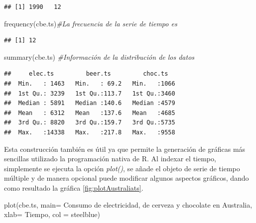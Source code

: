 \documentclass[
  spanish,
]{book}
\newenvironment{Shaded}{\begin{snugshade}}{\end{snugshade}}
\newcommand{\AttributeTok}[1]{\textcolor[rgb]{0.77,0.63,0.00}{#1}}
\newcommand{\CommentTok}[1]{\textcolor[rgb]{0.56,0.35,0.01}{\textit{#1}}}
\newcommand{\FunctionTok}[1]{\textcolor[rgb]{0.00,0.00,0.00}{#1}}
\newcommand{\NormalTok}[1]{#1}
\newcommand{\StringTok}[1]{\textcolor[rgb]{0.31,0.60,0.02}{#1}}
\theoremstyle{remark}
\begin{document}
\begin{verbatim}
## [1] 1990   12
\end{verbatim}

\begin{Shaded}
\begin{Highlighting}[]
\FunctionTok{frequency}\NormalTok{(cbe.ts)}\CommentTok{\#La frecuencia de la serie de tiempo es}
\end{Highlighting}
\end{Shaded}

\begin{verbatim}
## [1] 12
\end{verbatim}

\begin{Shaded}
\begin{Highlighting}[]
\FunctionTok{summary}\NormalTok{(cbe.ts) }\CommentTok{\#Información de la distribución de los datos}
\end{Highlighting}
\end{Shaded}

\begin{verbatim}
##     elec.ts         beer.ts         choc.ts    
##  Min.   : 1463   Min.   : 69.2   Min.   :1066  
##  1st Qu.: 3239   1st Qu.:113.7   1st Qu.:3460  
##  Median : 5891   Median :140.6   Median :4579  
##  Mean   : 6312   Mean   :137.6   Mean   :4685  
##  3rd Qu.: 8820   3rd Qu.:159.7   3rd Qu.:5735  
##  Max.   :14338   Max.   :217.8   Max.   :9558
\end{verbatim}

Esta construcción también es útil ya que permite la generación de gráficas más sencillas utilizado la programación nativa de R. Al indexar el tiempo, simplemente se ejecuta la opción \emph{plot()}, se añade el objeto de serie de tiempo múltiple y de manera opcional puede modificar algunos aspectos gráficos, dando como resultado la gráfica \ref{fig:plotAustraliats}.

\begin{Shaded}
\begin{Highlighting}[]
\FunctionTok{plot}\NormalTok{(cbe.ts, }
     \AttributeTok{main=} \StringTok{\textquotesingle{}Consumo de electricidad, de cerveza y chocolate en Australia\textquotesingle{}}\NormalTok{,}
     \AttributeTok{xlab=} \StringTok{\textquotesingle{}Tiempo\textquotesingle{}}\NormalTok{,}
     \AttributeTok{col =} \StringTok{\textquotesingle{}steelblue\textquotesingle{}}\NormalTok{)}
\end{Highlighting}
\end{Shaded}
\end{document}
